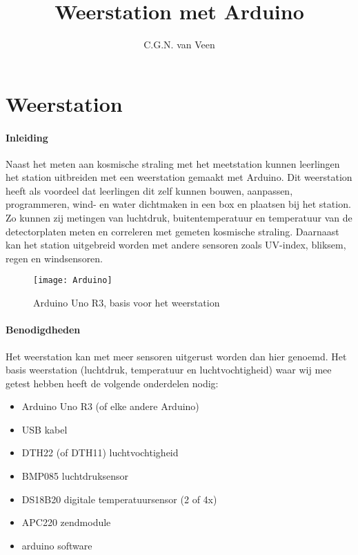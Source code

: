 

\title{Weerstation met Arduino}
\author{C.G.N. van Veen}



\maketitle

\section{Weerstation}

\paragraph{Inleiding}
Naast het meten aan kosmische straling met het \hisparc meetstation kunnen  
leerlingen het \hisparc station uitbreiden met een weerstation gemaakt met Arduino.
Dit weerstation heeft als voordeel dat leerlingen dit zelf kunnen bouwen, aanpassen,
programmeren, wind- en water dichtmaken in een box en plaatsen bij het station.
Zo kunnen zij metingen van luchtdruk, buitentemperatuur en temperatuur van de 
detectorplaten meten en correleren met gemeten kosmische straling. Daarnaast 
kan het station uitgebreid worden met andere sensoren zoals UV-index, bliksem, 
regen en windsensoren.

\begin{figure}
    \centering
    \texttt{[image: Arduino]}
    \caption{Arduino Uno R3, basis voor het weerstation}
   \label{fig:Arduino}
\end{figure}

\paragraph{Benodigdheden}
Het weerstation kan met meer sensoren uitgerust worden dan hier genoemd.
Het basis weerstation (luchtdruk, temperatuur en luchtvochtigheid) waar wij mee
getest hebben heeft de volgende onderdelen nodig: \\
\begin{itemize}
    \item Arduino Uno R3 (of elke andere Arduino)
    \item USB kabel
    \item DTH22 (of DTH11) luchtvochtigheid
    \item BMP085 luchtdruksensor
    \item DS18B20 digitale temperatuursensor (2 of 4x)
    \item APC220 zendmodule
    \item arduino software
\end{itemize}

